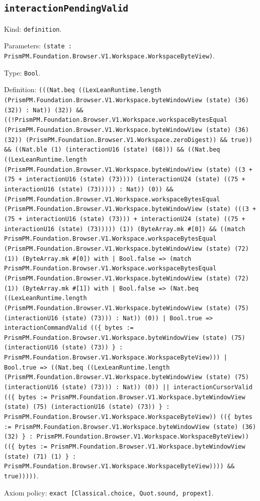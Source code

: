 \documentclass[11pt]{article}
\begin{document}
\subsection*{\texttt{interactionPendingValid}}
\noindent Kind: \texttt{definition}.\par
\noindent Parameters: \texttt{(state : PrismPM.Foundation.Browser.V1.Workspace.WorkspaceByteView)}.\par
\noindent Type: \texttt{Bool}.\par
\noindent Definition: \texttt{(((Nat.beq ((LexLeanRuntime.length (PrismPM.Foundation.Browser.V1.Workspace.byteWindowView (state) (36) (32)) : Nat)) (32)) \&\& ((!PrismPM.Foundation.Browser.V1.Workspace.workspaceBytesEqual (PrismPM.Foundation.Browser.V1.Workspace.byteWindowView (state) (36) (32)) (PrismPM.Foundation.Browser.V1.Workspace.zeroDigest)) \&\& true)) \&\& ((Nat.ble (1) (interactionU16 (state) (68))) \&\& ((Nat.beq ((LexLeanRuntime.length (PrismPM.Foundation.Browser.V1.Workspace.byteWindowView (state) ((3 + (75 + interactionU16 (state) (73)))) (interactionU24 (state) ((75 + interactionU16 (state) (73))))) : Nat)) (0)) \&\& (PrismPM.Foundation.Browser.V1.Workspace.workspaceBytesEqual (PrismPM.Foundation.Browser.V1.Workspace.byteWindowView (state) (((3 + (75 + interactionU16 (state) (73))) + interactionU24 (state) ((75 + interactionU16 (state) (73))))) (1)) (ByteArray.mk \#[0]) \&\& ((match PrismPM.Foundation.Browser.V1.Workspace.workspaceBytesEqual (PrismPM.Foundation.Browser.V1.Workspace.byteWindowView (state) (72) (1)) (ByteArray.mk \#[0]) with | Bool.false => (match PrismPM.Foundation.Browser.V1.Workspace.workspaceBytesEqual (PrismPM.Foundation.Browser.V1.Workspace.byteWindowView (state) (72) (1)) (ByteArray.mk \#[1]) with | Bool.false => (Nat.beq ((LexLeanRuntime.length (PrismPM.Foundation.Browser.V1.Workspace.byteWindowView (state) (75) (interactionU16 (state) (73))) : Nat)) (0)) | Bool.true => interactionCommandValid ((\{ bytes := PrismPM.Foundation.Browser.V1.Workspace.byteWindowView (state) (75) (interactionU16 (state) (73)) \} : PrismPM.Foundation.Browser.V1.Workspace.WorkspaceByteView))) | Bool.true => ((Nat.beq ((LexLeanRuntime.length (PrismPM.Foundation.Browser.V1.Workspace.byteWindowView (state) (75) (interactionU16 (state) (73))) : Nat)) (0)) || interactionCursorValid ((\{ bytes := PrismPM.Foundation.Browser.V1.Workspace.byteWindowView (state) (75) (interactionU16 (state) (73)) \} : PrismPM.Foundation.Browser.V1.Workspace.WorkspaceByteView)) ((\{ bytes := PrismPM.Foundation.Browser.V1.Workspace.byteWindowView (state) (36) (32) \} : PrismPM.Foundation.Browser.V1.Workspace.WorkspaceByteView)) ((\{ bytes := PrismPM.Foundation.Browser.V1.Workspace.byteWindowView (state) (71) (1) \} : PrismPM.Foundation.Browser.V1.Workspace.WorkspaceByteView)))) \&\& true)))))}.\par
\noindent Axiom policy: \texttt{exact [Classical.choice, Quot.sound, propext]}.\par
\end{document}
